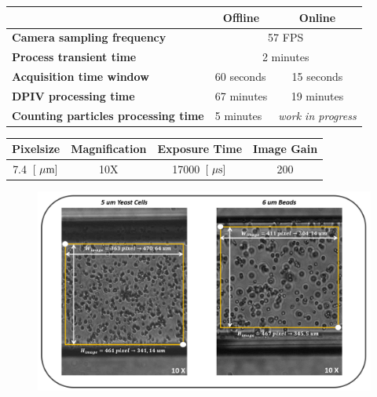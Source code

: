 \documentclass[journal]{IEEEtran}
\theoremstyle{definition}
\theoremstyle{remark}
\begin{document}
\begin{table}[t]
	\begin{tabular}{@{}llc@{}}
		\toprule
		\textbf{}                       & \multicolumn{1}{c}{\textbf{Offline}} & \textbf{Online}                            \\ \midrule
		\textbf{Camera sampling frequency}          & \multicolumn{2}{c}{57 FPS}                                                 \\
		\textbf{Process transient time}             & \multicolumn{2}{c}{2 minutes}                                              \\
		\textbf{Acquisition time window}            & 60 seconds                           & 15 seconds                          \\
		\textbf{DPIV processing time}               & 67 minutes                           & 19 minutes                          \\
		\textbf{Counting particles processing time} & 5 minutes                            & \textit{work in progress}           \\ \bottomrule
	\end{tabular}
\end{table}

\begin{table}[t]
	\begin{tabular}{@{}llll@{}}
		\toprule
		\textbf{Pixelsize}         & \textbf{Magnification}  & \textbf{Exposure Time}       & \textbf{Image Gain}     \\ \midrule
		\multicolumn{1}{c}{7.4~$[\rm~\mu m]$} & \multicolumn{1}{c}{10X} & \multicolumn{1}{c}{17000~$[\rm~\mu s]$} & \multicolumn{1}{c}{200} \\ \bottomrule
	\end{tabular}
\end{table}


\begin{figure}[b]
	\centering
	\includegraphics[width=1\columnwidth]{images/ROI}
\end{figure}
\end{document}
